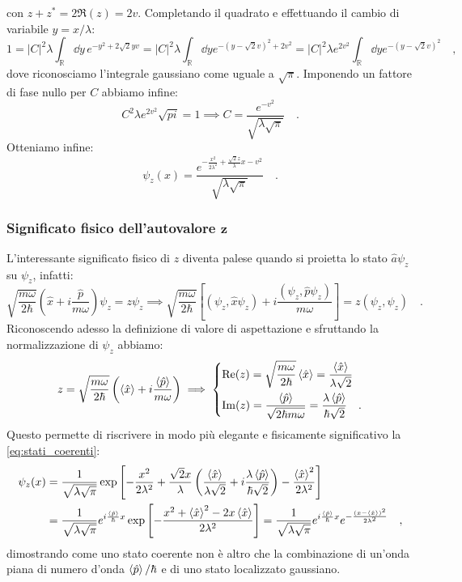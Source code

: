con $z + z^* = 2\Re(z) = 2v$. Completando il quadrato e effettuando il cambio di variabile $y = x/\lambda$:
\[
    1 = |C|^2 \lambda \int_{\mathbb{R}} \dd{y} \, e^{ -y^2 + 2\sqrt{2}yv } = |C|^2 \lambda \int_{\mathbb{R}} \dd{y} e^{-\left(y-\sqrt{2}v\right)^2+2v^2} = |C|^2 \lambda e^{2v^2} \int_{\mathbb{R}} \dd{y} e^{-\left(y-\sqrt{2}v\right)^2} \quad,
\]  
dove riconosciamo l'integrale gaussiano come uguale a $\sqrt{\pi}$. Imponendo un fattore di fase nullo per $C$ abbiamo infine:
\[
    C^2\lambda e^{2v^2}\sqrt{pi} = 1 \implies C = \frac{e^{-v^2}}{\sqrt{\lambda\sqrt{\pi}}} \quad.
\]
Otteniamo infine:
\begin{equation}
    \psi_z(x) = \frac{e^{-\frac{x^2}{2\lambda^2} + \frac{\sqrt{2}z}{\lambda}x-v^2}}{{\sqrt{\lambda\sqrt{\pi}}}} \quad.
    \label{eq:stati_coerenti}
\end{equation}

\subsubsection{Significato fisico dell'autovalore $\bm{z}$}
L'interessante significato fisico di $z$ diventa palese quando si proietta lo stato $\hat{a}\psi_z$ su $\psi_z$, infatti:
\[
    \sqrt{\frac{m\omega}{2\hbar}} \left( \hat{x} + i\frac{\hat{p}}{m\omega} \right)\psi_z = z\psi_z \implies \sqrt{\frac{m\omega}{2\hbar}} \left[ (\psi_z,\hat{x}\psi_z) + i\frac{(\psi_z,\hat{p}\psi_z)}{m\omega} \right]= z(\psi_z, \psi_z) \quad.
\]
Riconoscendo adesso la definizione di valore di aspettazione e sfruttando la normalizzazione di $\psi_z$ abbiamo:
\[
    z = \sqrt{\frac{m\omega}{2\hbar}} \left( \left\langle \hat{x} \right\rangle + i\frac{\left\langle \hat{p} \right\rangle}{m\omega} \right) \implies \begin{dcases}
    \operatorname{Re}(z) = \sqrt{\frac{m\omega}{2\hbar}}\left\langle \hat{x} \right\rangle = \frac{\left\langle \hat{x} \right\rangle}{\lambda\sqrt{2}}\\
    \operatorname{Im}(z) = \frac{\left\langle \hat{p} \right\rangle}{\sqrt{2\hbar m\omega}} = \frac{\lambda \left\langle \hat{p} \right\rangle}{\hbar \sqrt{2}} \quad.
    \end{dcases}
\]
Questo permette di riscrivere in modo più elegante e fisicamente significativo la \eqref{eq:stati_coerenti}:
\[
\begin{aligned}
        \psi_z(x) &= \frac{1}{\sqrt{\lambda\sqrt{\pi}}} \exp\left[ -\frac{x^2}{2\lambda^2} + \frac{\sqrt{2}x}{\lambda} \left(\frac{\left\langle \hat{x} \right\rangle}{\lambda\sqrt{2}} + i\frac{\lambda \left\langle \hat{p} \right\rangle}{\hbar \sqrt{2}}  \right) - \frac{\left\langle \hat{x} \right\rangle^2}{2\lambda^2} \right] \\
        &= \frac{1}{\sqrt{\lambda\sqrt{\pi}}} e^{i\frac{\left\langle \hat{p} \right\rangle}{\hbar}x} \exp\left[ -\frac{x^2 + \left\langle \hat{x} \right\rangle^2 - 2x\left\langle \hat{x} \right\rangle}{2\lambda^2} \right] = \frac{1}{\sqrt{\lambda\sqrt{\pi}}} e^{i\frac{\left\langle \hat{p} \right\rangle}{\hbar}x} e^{-\frac{(x-\left\langle \hat{x} \right\rangle)^2}{2\lambda^2}} \quad,
\end{aligned}
\]
dimostrando come uno stato coerente non è altro che la combinazione di un'onda piana di numero d'onda $\left\langle \hat{p} \right\rangle/\hbar$ e di uno stato localizzato gaussiano.

